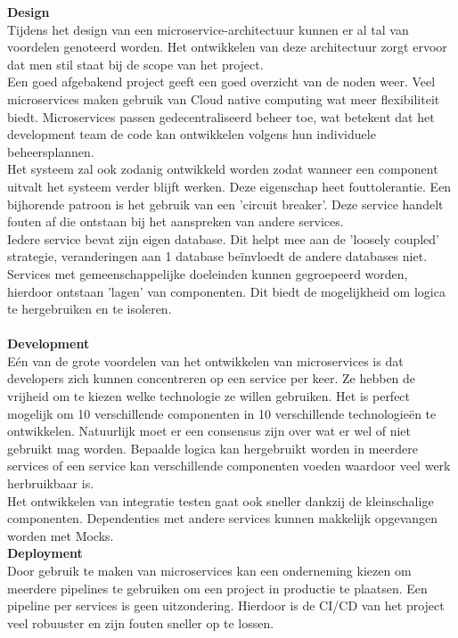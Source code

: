 \textbf{Design}\\ 
Tijdens het design van een microservice-architectuur kunnen er al tal van voordelen genoteerd worden. Het ontwikkelen van deze architectuur zorgt ervoor dat men stil staat bij de scope van het project.\\ 
Een goed afgebakend project geeft een goed overzicht van de noden weer. Veel microservices maken gebruik van Cloud native computing wat meer flexibiliteit biedt. Microservices passen gedecentraliseerd beheer toe, wat betekent dat het development team de code kan ontwikkelen volgens hun individuele beheersplannen.\\ 
Het systeem zal ook zodanig ontwikkeld worden zodat wanneer een component uitvalt het systeem verder blijft werken. Deze eigenschap heet fouttolerantie. Een bijhorende patroon is het gebruik van een 'circuit breaker'. Deze service handelt fouten af die ontstaan bij het aanspreken van andere services.\\
Iedere service bevat zijn eigen database. Dit helpt mee aan de 'loosely coupled' strategie, veranderingen aan 1 database beïnvloedt de andere databases niet.\\
Services met gemeenschappelijke doeleinden kunnen gegroepeerd worden, hierdoor ontstaan 'lagen' van
componenten. Dit biedt de mogelijkheid om logica te hergebruiken en te isoleren.\\ \\
\textbf{Development}\\ Eén van de grote voordelen van het ontwikkelen van microservices is dat developers zich kunnen concentreren op een service per keer. Ze hebben de vrijheid om te kiezen welke technologie ze willen gebruiken. Het is perfect mogelijk om 10 verschillende componenten in 10 verschillende technologieën te ontwikkelen. Natuurlijk moet er een consensus zijn over wat er wel of niet gebruikt mag worden. Bepaalde logica kan hergebruikt worden in meerdere services of een service kan verschillende componenten voeden waardoor veel werk herbruikbaar is. \\
Het ontwikkelen van integratie testen gaat ook sneller dankzij de kleinschalige componenten. Dependenties met andere services kunnen makkelijk opgevangen worden met Mocks.\\
\textbf{Deployment}\\ Door gebruik te maken van microservices kan een onderneming kiezen om meerdere pipelines te gebruiken om een project in productie te plaatsen. Een pipeline per services is geen uitzondering. Hierdoor is de CI/CD van het project veel robuuster en zijn fouten sneller op te lossen.

